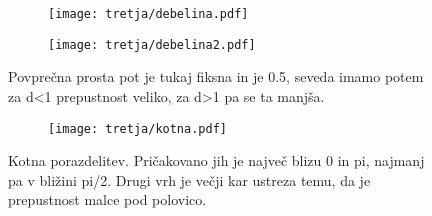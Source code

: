 \documentclass{article}
\begin{document}
\begin{figure}[H]
\centering
\begin{subfigure}{.49\textwidth}
\texttt{[image: tretja/debelina.pdf]}
\end{subfigure}
\begin{subfigure}{.49\textwidth}
\texttt{[image: tretja/debelina2.pdf]}
\end{subfigure}
\caption*{Povprečna prosta pot je tukaj fiksna in je 0.5, seveda imamo potem za d<1 prepustnost veliko, za d>1 pa se ta manjša.}
\end{figure}

\begin{figure}[H]
\centering
\begin{subfigure}{.7\textwidth}
\texttt{[image: tretja/kotna.pdf]}
\end{subfigure}
\caption*{Kotna porazdelitev. Pričakovano jih je največ blizu 0 in pi, najmanj pa v bližini pi/2. Drugi vrh je večji kar ustreza temu, da je prepustnost malce pod polovico.}
\end{figure}
\end{document}
